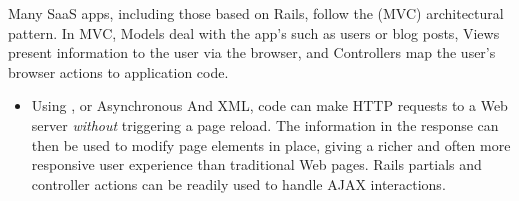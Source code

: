Many SaaS apps, including those based on Rails,
follow the  (MVC) architectural
pattern. In MVC, Models deal with the
app's  such as users or blog posts,
Views present
information to the user via the browser, and Controllers  map the
user's browser actions to application code.

\begin{itemize}
\item Using , or Asynchronous \js{} And XML,
\js{} code can make
HTTP requests to a Web server \emph{without} triggering a page
reload.  The information in the response can then be used to modify page
elements in place, giving a richer and often more responsive
user experience than traditional
Web pages.  Rails partials and controller actions
can be readily used to handle AJAX interactions.
\end{itemize}
